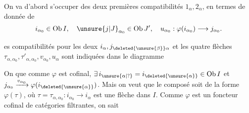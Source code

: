 

On va d'abord s'occuper des deux premières compatibilités $1_\alpha,2_\alpha$, en termes de  donnée de
\[
i_{\alpha_0}\in\operatorname{Ob} I,\quad \unsure{j|J}_{\alpha_0}\in\operatorname{Ob} J',\quad u_{\alpha_0}:\varphi(i_{\alpha_0})\longrightarrow j_{\alpha_0}.
\]

es  compatibilités  pour les deux  $i_\alpha,j_{\deleted{\unsure{\beta}}\alpha}$ et les quatre flèches $\tau_{\alpha,\alpha_0},\tau'_{\alpha,\alpha_0},v_{\alpha_0},u_\alpha$ sont indiquées dans le diagramme

On  que comme $\varphi$ est cofinal, $\exists\,i_{\unsure{\alpha|?}}=i_{\deleted{\unsure{\alpha}}}\in\operatorname{Ob} I$ et $j_{\alpha_0}\xrightarrow{v_{\alpha_0}}\varphi(i_{\deleted{\unsure{\alpha}}})$. Mais on veut que le composé
soit de la forme $\varphi(\tau)$, où $\tau=\tau_{\alpha,\alpha_0}:i_{\alpha_0}\longrightarrow i_\alpha$ est une flèche dans $I$. Comme $\varphi$ est un foncteur cofinal de catégories filtrantes, on sait
